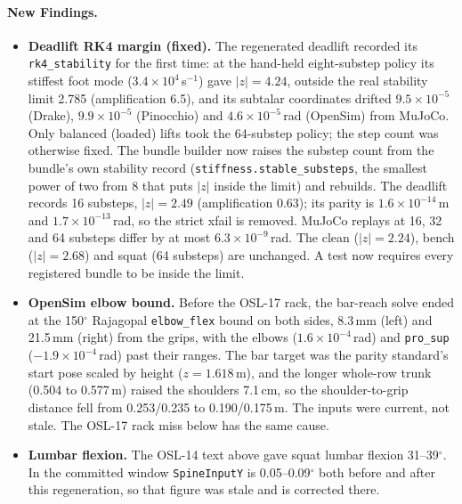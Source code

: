 \documentclass[11pt,a4paper]{article}
\begin{document}
\paragraph{New Findings.}
\begin{itemize}[nosep]
\item \textbf{Deadlift RK4 margin (fixed).} The regenerated deadlift recorded
  its \texttt{rk4\_stability} for the first time: at the hand-held
  eight-substep policy its stiffest foot mode ($3.4\times10^4$\,s$^{-1}$) gave
  $|z|=4.24$, outside the real stability limit 2.785 (amplification 6.5), and
  its subtalar coordinates drifted $9.5\times10^{-5}$ (Drake),
  $9.9\times10^{-5}$ (Pinocchio) and $4.6\times10^{-5}$\,rad (OpenSim) from
  MuJoCo. Only balanced (loaded) lifts took the 64-substep policy; the step
  count was otherwise fixed. The bundle builder now raises the substep count
  from the bundle's own stability record (\texttt{stiffness.stable\_substeps},
  the smallest power of two from 8 that puts $|z|$ inside the limit) and
  rebuilds. The deadlift records 16 substeps, $|z|=2.49$ (amplification
  0.63); its parity is $1.6\times10^{-14}$\,m and $1.7\times10^{-13}$\,rad,
  so the strict xfail is removed. MuJoCo replays at 16, 32 and 64 substeps
  differ by at most $6.3\times10^{-9}$\,rad. The clean ($|z|=2.24$), bench
  ($|z|=2.68$) and squat (64 substeps) are unchanged. A test now requires
  every registered bundle to be inside the limit.
\item \textbf{OpenSim elbow bound.} Before the OSL-17 rack, the bar-reach
  solve ended at the 150$^\circ$ Rajagopal \texttt{elbow\_flex} bound on both
  sides, 8.3\,mm (left) and 21.5\,mm (right) from the grips, with the elbows
  ($1.6\times10^{-4}$\,rad) and \texttt{pro\_sup} ($-1.9\times10^{-4}$\,rad)
  past their ranges. The bar target was the parity standard's start pose
  scaled by height ($z=1.618$\,m), and the longer whole-row trunk (0.504 to
  0.577\,m) raised the shoulders 7.1\,cm, so the shoulder-to-grip distance
  fell from 0.253/0.235 to 0.190/0.175\,m. The inputs were current, not
  stale. The OSL-17 rack miss below has the same cause.
\item \textbf{Lumbar flexion.} The OSL-14 text above gave squat lumbar
  flexion 31--39$^\circ$. In the committed window \texttt{SpineInputY} is
  0.05--0.09$^\circ$ both before and after this regeneration, so that figure
  was stale and is corrected there.
\end{itemize}
\end{document}
